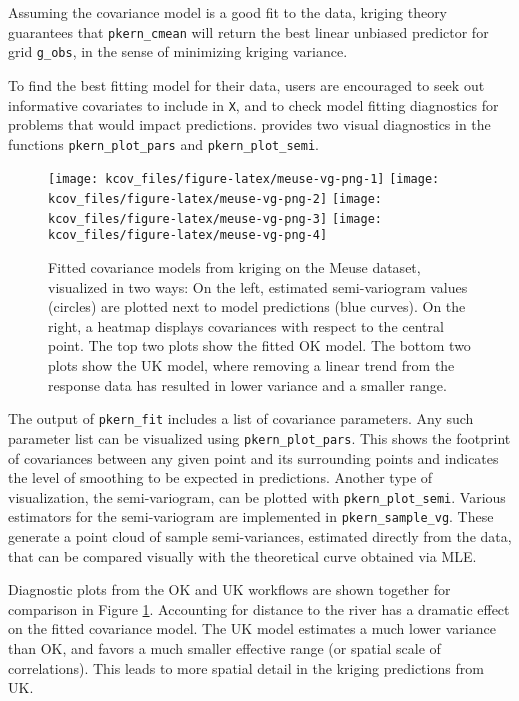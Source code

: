 Assuming the covariance model is a good fit to the data, kriging theory guarantees that \texttt{pkern\_cmean} will return the best linear unbiased predictor for grid \texttt{g\_obs}, in the sense of minimizing kriging variance.

To find the best fitting model for their data, users are encouraged to seek out informative covariates to include in \texttt{X}, and to check model fitting diagnostics for problems that would impact predictions.  provides two visual diagnostics in the functions \texttt{pkern\_plot\_pars} and \texttt{pkern\_plot\_semi}.

\begin{figure}[!htb]
\texttt{[image: kcov\_files/figure-latex/meuse-vg-png-1]} \texttt{[image: kcov\_files/figure-latex/meuse-vg-png-2]} \texttt{[image: kcov\_files/figure-latex/meuse-vg-png-3]} \texttt{[image: kcov\_files/figure-latex/meuse-vg-png-4]} \caption{Fitted covariance models from kriging on the Meuse dataset, visualized in two ways: On the left, estimated semi-variogram values (circles) are plotted next to model predictions (blue curves). On the right, a heatmap displays covariances with respect to the central point. The top two plots show the fitted OK model. The bottom two plots show the UK model, where removing a linear trend from the response data has resulted in lower variance and a smaller range.}\label{fig:meuse-vg-png}
\end{figure}

The output of \texttt{pkern\_fit} includes a list of covariance parameters. Any such parameter list can be visualized using \texttt{pkern\_plot\_pars}. This shows the footprint of covariances between any given point and its surrounding points and indicates the level of smoothing to be expected in predictions. Another type of visualization, the semi-variogram, can be plotted with \texttt{pkern\_plot\_semi}. Various estimators for the semi-variogram are implemented in \texttt{pkern\_sample\_vg}. These generate a point cloud of sample semi-variances, estimated directly from the data, that can be compared visually with the theoretical curve obtained via MLE.

Diagnostic plots from the OK and UK workflows are shown together for comparison in Figure \ref{fig:meuse-vg-png}. Accounting for distance to the river has a dramatic effect on the fitted covariance model. The UK model estimates a much lower variance than OK, and favors a much smaller effective range (or spatial scale of correlations). This leads to more spatial detail in the kriging predictions from UK.

